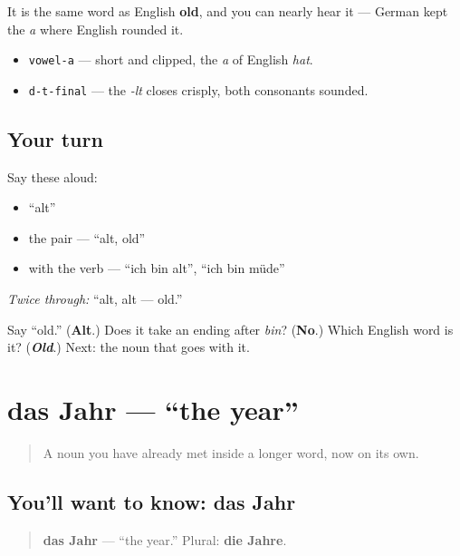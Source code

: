 It is the same word as English \textbf{old}, and you can nearly hear it — German kept the \emph{a} where English rounded it.

\begin{sounds}
\begin{itemize}
\raggedright
  \item \texttt{vowel-a} — short and clipped, the \emph{a} of English \emph{hat}.
  \item \texttt{d-t-final} — the \emph{-lt} closes crisply, both consonants sounded.
\end{itemize}
\end{sounds}

\subsection*{Your turn}
Say these aloud:

\begin{itemize}
\raggedright
  \item \textquotedblleft{}alt\textquotedblright{}
  \item the pair — \textquotedblleft{}alt, old\textquotedblright{}
  \item with the verb — \textquotedblleft{}ich bin alt\textquotedblright{}, \textquotedblleft{}ich bin müde\textquotedblright{}
\end{itemize}

\emph{Twice through:} \textquotedblleft{}alt, alt — old.\textquotedblright{}

\begin{tcolorbox}[breakable,colback=teal!4,colframe=teal!35!black,title={Before you move on}]
Say \textquotedblleft{}old.\textquotedblright{} (\textbf{Alt}.) Does it take an ending after \emph{bin}? (\textbf{No}.) Which English word is it? (\emph{\textbf{Old}}.) Next: the noun that goes with it.
\end{tcolorbox}
\section[das Jahr]{das Jahr — \textquotedblleft{}the year\textquotedblright{}}

\label{lesson:GE-C14-jahr}



\begin{quote}
A noun you have already met inside a longer word, now on its own.
\end{quote}

\subsection*{You'll want to know: das Jahr}
\begin{quote}
\textbf{das Jahr} — \textquotedblleft{}the year.\textquotedblright{} Plural: \textbf{die Jahre}.
\end{quote}

